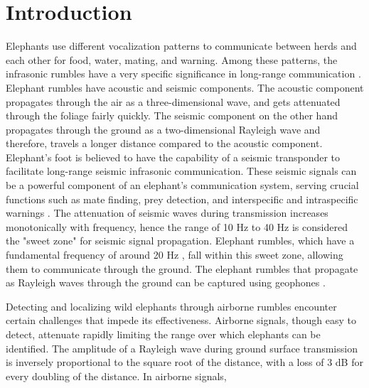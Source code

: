 \documentclass[applsci,article,accept,moreauthors,pdftex]{Definitions/mdpi}
\begin{document}
\section{Introduction}
Elephants use different vocalization patterns to communicate between herds and each other for food, water, mating, and warning. Among these patterns, the infrasonic rumbles have a very specific significance in long-range communication \cite{nair2009vocalizations}. Elephant rumbles have acoustic and seismic components. The acoustic component propagates through the air as a three-dimensional wave, and gets attenuated through the foliage fairly quickly. The seismic component on the other hand propagates through the ground as a two-dimensional Rayleigh wave and therefore, travels a longer distance compared to the acoustic component. Elephant's foot is believed to have the capability of a seismic transponder to facilitate long-range seismic infrasonic communication. These seismic signals can be a powerful component of an elephant’s communication system, serving crucial functions such as mate finding, prey detection, and interspecific and intraspecific warnings \cite{o2000seismic}. The attenuation of seismic waves during transmission increases monotonically with frequency, hence the range of 10 Hz to 40 Hz is considered the "sweet zone" for seismic signal propagation. Elephant rumbles, which have a fundamental frequency of around 20 Hz \cite{payne1986infrasonic}, fall within this sweet zone, allowing them to communicate through the ground. The elephant rumbles that propagate as Rayleigh waves through the ground can be captured using geophones \cite{gunther2004seismic}.\par
Detecting and localizing wild elephants through airborne rumbles encounter certain challenges that impede its effectiveness. Airborne signals, though easy to detect, attenuate rapidly limiting the range over which elephants can be identified. The amplitude of a Rayleigh wave during ground surface transmission is inversely proportional to
the square root of the distance, with a loss of 3 dB for every doubling of the distance. In airborne signals,
\end{document}

